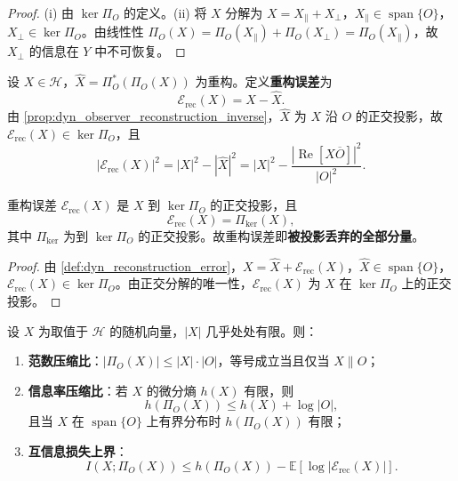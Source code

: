 \begin{proof}
(i) 由 $\ker\Pi_O$ 的定义。(ii) 将 $X$ 分解为 $X=X_\parallel+X_\perp$，$X_\parallel\in\operatorname{span}\{O\}$，$X_\perp\in\ker\Pi_O$。由线性性 $\Pi_O(X)=\Pi_O(X_\parallel)+\Pi_O(X_\perp)=\Pi_O(X_\parallel)$，故 $X_\perp$ 的信息在 $Y$ 中不可恢复。
\end{proof}

\begin{definition}[重构误差]\label{def:dyn_reconstruction_error}
设 $X\in\mathcal H$，$\widehat X=\Pi_O^\ast(\Pi_O(X))$ 为重构。定义\textbf{重构误差}为
\[
\mathcal E_{\text{rec}}(X)=X-\widehat X.
\]
由 \cref{prop:dyn_observer_reconstruction_inverse}，$\widehat X$ 为 $X$ 沿 $O$ 的正交投影，故 $\mathcal E_{\text{rec}}(X)\in\ker\Pi_O$，且
\[
|\mathcal E_{\text{rec}}(X)|^2=|X|^2-|\widehat X|^2=|X|^2-\frac{|\operatorname{Re}[X\overline O]|^2}{|O|^2}.
\]
\end{definition}

\begin{proposition}[重构误差的几何解释]\label{prop:dyn_reconstruction_error_geometry}
重构误差 $\mathcal E_{\text{rec}}(X)$ 是 $X$ 到 $\ker\Pi_O$ 的正交投影，且
\[
\mathcal E_{\text{rec}}(X)=\Pi_{\ker}(X),
\]
其中 $\Pi_{\ker}$ 为到 $\ker\Pi_O$ 的正交投影。故重构误差即\textbf{被投影丢弃的全部分量}。
\end{proposition}

\begin{proof}
由 \cref{def:dyn_reconstruction_error}，$X=\widehat X+\mathcal E_{\text{rec}}(X)$，$\widehat X\in\operatorname{span}\{O\}$，$\mathcal E_{\text{rec}}(X)\in\ker\Pi_O$。由正交分解的唯一性，$\mathcal E_{\text{rec}}(X)$ 为 $X$ 在 $\ker\Pi_O$ 上的正交投影。
\end{proof}

\begin{theorem}[信息压缩的定量界]\label{thm:dyn_information_compression_bound}
设 $X$ 为取值于 $\mathcal H$ 的随机向量，$|X|$ 几乎处处有限。则：
\begin{enumerate}[label=(\roman*)]
    \item \textbf{范数压缩比}：$|\Pi_O(X)|\le|X|\cdot|O|$，等号成立当且仅当 $X\parallel O$；
    \item \textbf{信息率压缩比}：若 $X$ 的微分熵 $h(X)$ 有限，则
    \[
    h(\Pi_O(X))\le h(X)+\log|O|,
    \]
    且当 $X$ 在 $\operatorname{span}\{O\}$ 上有界分布时 $h(\Pi_O(X))$ 有限；
    \item \textbf{互信息损失上界}：
    \[
    I(X;\Pi_O(X))\le h(\Pi_O(X))-\mathbb E[\log|\mathcal E_{\text{rec}}(X)|].
    \]
\end{enumerate}
\end{theorem}

